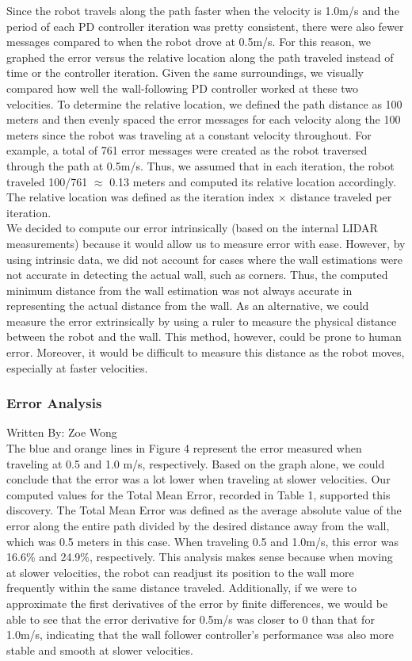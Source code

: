 \documentclass{article}
\begin{document}
Since the robot travels along the path faster when the velocity is 1.0m/s and the period of each PD controller iteration was pretty consistent, there were also fewer messages compared to when the robot drove at 0.5m/s. For this reason, we graphed the error versus the relative location along the path traveled instead of time or the controller iteration. Given the same surroundings, we visually compared how well the wall-following PD controller worked at these two velocities. To determine the relative location, we defined the path distance as 100 meters and then evenly spaced the error messages for each velocity along the 100 meters since the robot was traveling at a constant velocity throughout. For example, a total of 761 error messages were created as the robot traversed through the path at 0.5m/s. Thus, we assumed that in each iteration, the robot traveled 100/761 $\approx$ 0.13 meters and computed its relative location accordingly. The relative location was defined as the iteration index $\times$ distance traveled per iteration. \\

We decided to compute our error intrinsically (based on the internal LIDAR measurements) because it would allow us to measure error with ease. However, by using intrinsic data, we did not account for cases where the wall estimations were not accurate in detecting the actual wall, such as corners. Thus, the computed minimum distance from the wall estimation was not always accurate in representing the actual distance from the wall. As an alternative, we could measure the error extrinsically by using a ruler to measure the physical distance between the robot and the wall. This method, however, could be prone to human error. Moreover, it would be difficult to measure this distance as the robot moves, especially at faster velocities. \\

\subsubsection{Error Analysis}
Written By: Zoe Wong\\

The blue and orange lines in Figure 4 represent the error measured when traveling at 0.5 and 1.0 m/s, respectively. Based on the graph alone, we could conclude that the error was a lot lower when traveling at slower velocities. Our computed values for the Total Mean Error, recorded in Table 1, supported this discovery. The Total Mean Error was defined as the average absolute value of the error along the entire path divided by the desired distance away from the wall, which was 0.5 meters in this case. When traveling 0.5 and 1.0m/s, this error was 16.6\% and 24.9\%, respectively. This analysis makes sense because when moving at slower velocities, the robot can readjust its position to the wall more frequently within the same distance traveled. Additionally, if we were to approximate the first derivatives of the error by finite differences, we would be able to see that the error derivative for 0.5m/s was closer to 0 than that for 1.0m/s, indicating that the wall follower controller's performance was also more stable and smooth at slower velocities. \\
\end{document}
